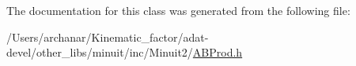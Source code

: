 The documentation for this class was generated from the following file\+:\begin{DoxyCompactItemize}
\item 
/\+Users/archanar/\+Kinematic\+\_\+factor/adat-\/devel/other\+\_\+libs/minuit/inc/\+Minuit2/\mbox{\hyperlink{adat-devel_2other__libs_2minuit_2inc_2Minuit2_2ABProd_8h}{A\+B\+Prod.\+h}}\end{DoxyCompactItemize}
